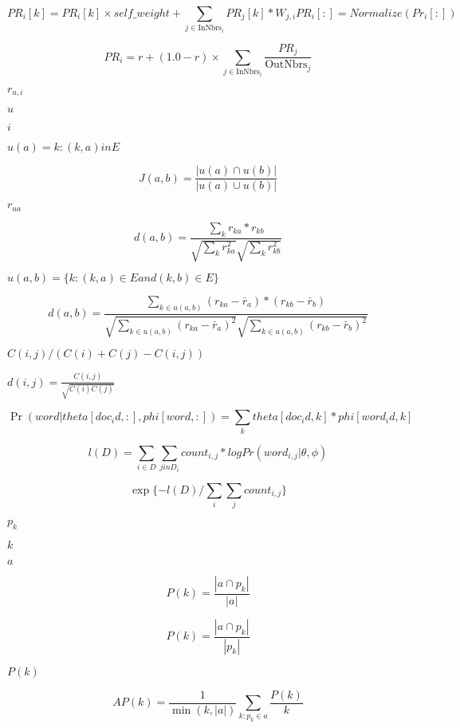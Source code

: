 \documentclass{article}
\begin{document}
\[ PR_i[k] = PR_i[k] \times self\_weight + \sum_{j\in\textrm{InNbrs}_i} PR_j[k] * W_{j,i} PR_i[:] = Normalize(Pr_i[:]) \]
\pagebreak

\[ PR_i = r + (1.0 - r) \times \sum_{j\in\textrm{InNbrs}_i} \frac{PR_j}{\textrm{OutNbrs}_j} \]
\pagebreak

$ r_{u,i} $
\pagebreak

$ u $
\pagebreak

$ i $
\pagebreak

$u(a) = {k: (k,a) in E}$
\pagebreak

\[J(a,b) = \frac{| u(a) \cap u(b) |}{ | u(a) \cup u(b) |} \]
\pagebreak

$ r_{ua}$
\pagebreak

\[ d(a,b) = \frac{\sum_{k} r_{ka} * r_{kb}} {\sqrt{\sum_{k} r_{ka}^2} \sqrt{\sum_{k} r_{kb}^2}} \]
\pagebreak

$ u(a,b) = \{k: (k,a) \in E and (k,b) \in E\} $
\pagebreak

\[ d(a,b) = \frac{\sum_{k \in u(a,b)} (r_{ka} - \bar{r}_a) * (r_{kb} - \bar{r}_b)} {\sqrt{\sum_{k \in u(a,b)} (r_{ka} - \bar{r}_a)^2} \sqrt{\sum_{k \in u(a,b)} (r_{kb} - \bar{r}_b)^2}} \]
\pagebreak

$ C(i,j)/(C(i) + C(j) - C(i,j)) $
\pagebreak

$ d(i,j) = \frac{C(i,j)}{\sqrt{C(i)C(j)}} $
\pagebreak

\[ \Pr(word | theta[doc_id,:], phi[word,:]) = \sum_k theta[doc_id, k] * phi[word_id, k] \]
\pagebreak

\[l(D) = \sum_{i \in D} \sum_{j in D_i} count_{i,j} * log Pr(word_{i,j} | \theta, \phi)\]
\pagebreak

\[\exp \{ - l(D) / \sum_i \sum_j count_{i,j} \}\]
\pagebreak

$p_k$
\pagebreak

$k$
\pagebreak

$a$
\pagebreak

\[ P(k) = \frac{ | a \cap p_k | }{|a|} \]
\pagebreak

\[ P(k) = \frac{ | a \cap p_k | }{|p_k|} \]
\pagebreak

$P(k)$
\pagebreak

\[ AP(k) = \frac{1}{\min(k, |a|)}\sum_{k: p_k \in a} \frac{P(k)}{k} \]
\pagebreak
\end{document}
